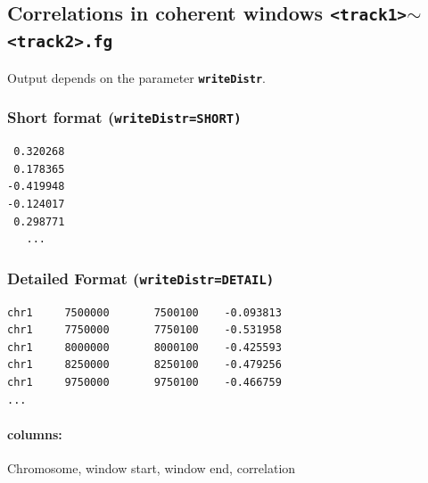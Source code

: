 \documentclass{article}
\newcommand{\tw}{\textwidth}
\newcommand{\prm}[1]{\texttt{\textbf{{#1}}}}
\begin{document}
\subsection{Correlations in coherent windows \prm{<track1>$\sim$<track2>.fg}}
Output depends on the parameter \prm{writeDistr}. 

\subsubsection{Short format (\prm{writeDistr=SHORT)}}
 
\begin{minipage}{0.2\tw}
\begin{shaded} 
\begin{verbatim}
 0.320268
 0.178365
-0.419948
-0.124017
 0.298771
   ...
\end{verbatim}
\end{shaded}
\end{minipage}

\subsubsection{Detailed Format (\prm{writeDistr=DETAIL)}}

\begin{minipage}{0.5\tw}
\begin{shaded} 
\begin{verbatim}
chr1     7500000       7500100    -0.093813
chr1     7750000       7750100    -0.531958
chr1     8000000       8000100    -0.425593
chr1     8250000       8250100    -0.479256
chr1     9750000       9750100    -0.466759
...                              
\end{verbatim}
\end{shaded}
\end{minipage}

\paragraph{columns:} Chromosome, window start,  window end, correlation
\end{document}
